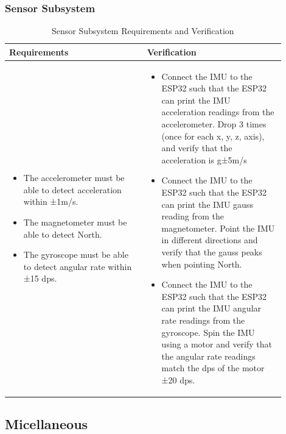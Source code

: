 \subsubsection{Sensor Subsystem}
\begin{table}[ht]
    \centering
    \caption{Sensor Subsystem Requirements and Verification}
    \begin{tabular}{p{0.45\linewidth}p{0.45\linewidth}}
    \toprule
    \textbf{Requirements} & \textbf{Verification} \\
    \midrule
    \begin{itemize}[leftmargin=*, nosep]
        \item The accelerometer must be able to detect acceleration within ±1m/s.
        \item The magnetometer must be able to detect North.
        \item The gyroscope must be able to detect angular rate within ±15 dps.
        
        
    \end{itemize} &
    \begin{itemize}[leftmargin=*, nosep]
        \item Connect the IMU to the ESP32 such that the ESP32 can print the IMU acceleration readings from the accelerometer. Drop 3 times (once for each x, y, z, axis), and verify that the acceleration is g±5m/s
        \item Connect the IMU to the ESP32 such that the ESP32 can print the IMU gauss reading from the magnetometer. Point the IMU in different directions and verify that the gauss peaks when pointing North.
        \item Connect the IMU to the ESP32 such that the ESP32 can print the IMU angular rate readings from the gyroscope. Spin the IMU using a motor and verify that the angular rate readings match the dps of the motor ±20 dps.
        
    \end{itemize} \\
    \bottomrule
    \end{tabular}
    \end{table}
    \newpage

\subsection{Micellaneous} \label{appendix:a:code}

